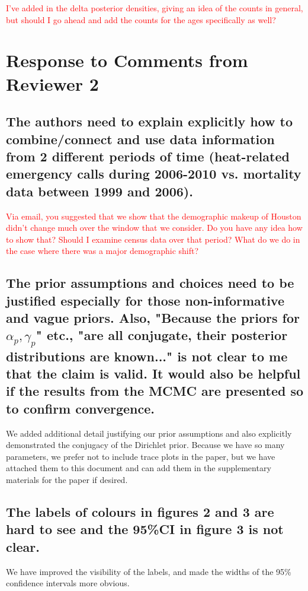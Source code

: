 \documentclass{article}
\begin{document}
\textcolor{red}{I've added in the delta posterior densities, giving an idea of the counts in general, but should I go ahead and add the counts for the ages specifically as well?}

\section{Response to Comments from Reviewer 2}
\subsection{The authors need to explain explicitly how to combine/connect and use data information from 2 different periods of time (heat-related emergency calls  during 2006-2010 vs. mortality data between 1999 and 2006).}

\textcolor{red}{Via email, you suggested that we show that the demographic makeup of Houston didn't change much over the window that we consider. Do you have any idea how to show that? Should I examine census data over that period? What do we do in the case where there was a major demographic shift?}

\subsection{The prior assumptions and choices need to be justified especially for those non-informative and vague priors. Also, "Because the priors for $\alpha_p, \gamma_p$" etc., "are all conjugate, their posterior distributions are known..." is not clear to me that the claim is valid. It would also be helpful if the results from the MCMC are presented so to confirm convergence.}

We added additional detail justifying our prior assumptions and also explicitly demonstrated the conjugacy of the Dirichlet prior. Because we have so many parameters, we prefer not to include trace plots in the paper, but we have attached them to this document and can add them in the supplementary materials for the paper if desired. 

\subsection{The labels of colours in figures 2 and 3 are hard to see and the 95\%CI in figure 3 is not clear.}

We have improved the visibility of the labels, and made the widths of the 95\% confidence intervals more obvious. 
\end{document}
